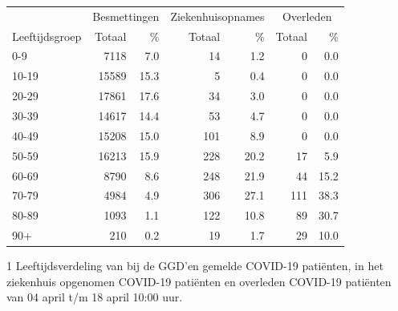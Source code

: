 \documentclass[
  english,
  man,floatsintext]{apa6}
\begin{document}
\begin{table}
\centering\begingroup\fontsize{11}{13}\selectfont

\begin{threeparttable}
\begin{tabular}{lrrrrrr}
\toprule
\multicolumn{1}{c}{ } & \multicolumn{2}{c}{Besmettingen} & \multicolumn{2}{c}{Ziekenhuisopnames} & \multicolumn{2}{c}{Overleden} \\
\cmidrule(l{3pt}r{3pt}){2-3} \cmidrule(l{3pt}r{3pt}){4-5} \cmidrule(l{3pt}r{3pt}){6-7}
Leeftijdsgroep & Totaal & \% & Totaal & \% & Totaal & \%\\
\midrule
0-9 & 7118 & 7.0 & 14 & 1.2 & 0 & 0.0\\
10-19 & 15589 & 15.3 & 5 & 0.4 & 0 & 0.0\\
20-29 & 17861 & 17.6 & 34 & 3.0 & 0 & 0.0\\
30-39 & 14617 & 14.4 & 53 & 4.7 & 0 & 0.0\\
40-49 & 15208 & 15.0 & 101 & 8.9 & 0 & 0.0\\
50-59 & 16213 & 15.9 & 228 & 20.2 & 17 & 5.9\\
60-69 & 8790 & 8.6 & 248 & 21.9 & 44 & 15.2\\
70-79 & 4984 & 4.9 & 306 & 27.1 & 111 & 38.3\\
80-89 & 1093 & 1.1 & 122 & 10.8 & 89 & 30.7\\
90+ & 210 & 0.2 & 19 & 1.7 & 29 & 10.0\\
\bottomrule
\end{tabular}
\begin{tablenotes}
\item[1] Leeftijdsverdeling van bij de GGD’en gemelde COVID-19 patiënten, in het ziekenhuis opgenomen COVID-19 patiënten en overleden COVID-19 patiënten van 04 april t/m 18 april 10:00 uur.
\end{tablenotes}
\end{threeparttable}
\endgroup{}
\end{table}

\newpage
\end{document}
